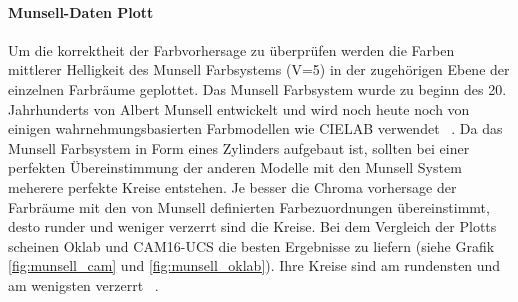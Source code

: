\documentclass[12pt, a4paper, ngerman]{article}
\begin{document}
\paragraph{Munsell-Daten Plott}
Um die korrektheit der Farbvorhersage zu überprüfen werden die Farben mittlerer Helligkeit des Munsell Farbsystems (V=5) 
in der zugehörigen Ebene der einzelnen Farbräume geplottet. 
Das Munsell Farbsystem wurde zu beginn des 20. Jahrhunderts von Albert Munsell entwickelt und 
wird noch heute noch von einigen wahrnehmungsbasierten Farbmodellen wie CIELAB verwendet ~\cite{Munsell_color_system_2022}.
Da das Munsell Farbsystem in Form eines Zylinders aufgebaut ist, 
sollten bei einer perfekten Übereinstimmung der anderen Modelle mit den Munsell System meherere perfekte Kreise entstehen.
Je besser die Chroma vorhersage der Farbräume mit den von Munsell definierten Farbezuordnungen übereinstimmt, 
desto runder und weniger verzerrt sind die Kreise. Bei dem Vergleich der Plotts scheinen Oklab und CAM16-UCS die besten Ergebnisse zu liefern (siehe Grafik \ref{fig:munsell_cam} und \ref{fig:munsell_oklab}). 
Ihre Kreise sind am rundensten und am wenigsten verzerrt ~\cite{Oklab_2020}.
\end{document}
